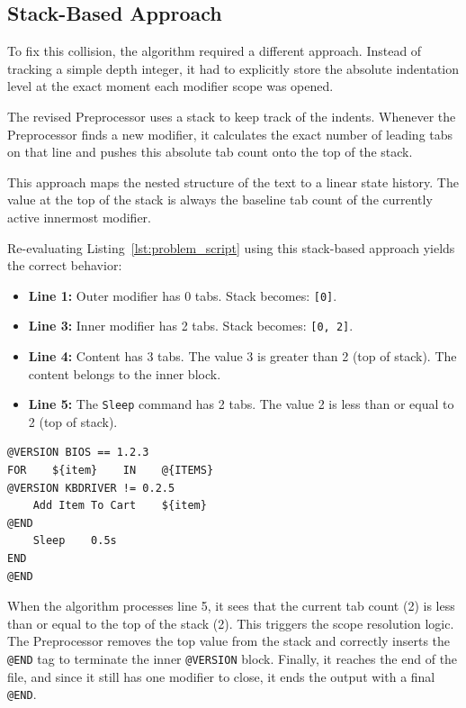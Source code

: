 \subsection{Stack-Based Approach}


To fix this collision, the algorithm required a different approach. Instead of tracking a simple depth integer, it had to explicitly store the absolute indentation level at the exact moment each modifier scope was opened. 

The revised Preprocessor uses a stack to keep track of the indents. Whenever the Preprocessor finds a new modifier, it calculates the exact number of leading tabs on that line and pushes this absolute tab count onto the top of the stack.


This approach maps the nested structure of the text to a linear state history. The value at the top of the stack is always the baseline tab count of the currently active innermost modifier.


Re-evaluating Listing~\ref{lst:problem_script} using this stack-based approach yields the correct behavior:

\begin{itemize}

    \item \textbf{Line 1:} Outer modifier has 0 tabs. Stack becomes: \texttt{[0]}.

    \item \textbf{Line 3:} Inner modifier has 2 tabs. Stack becomes: \texttt{[0, 2]}.

    \item \textbf{Line 4:} Content has 3 tabs. The value 3 is greater than 2 (top of stack). The content belongs to the inner block.

    \item \textbf{Line 5:} The \texttt{Sleep} command has 2 tabs. The value 2 is less than or equal to 2 (top of stack). 

\end{itemize}

\begin{lstlisting}[caption={Correct output of the problematic script with the final approach}, label={lst:problem_script_correct}, float=htbp]
@VERSION BIOS == 1.2.3
FOR    ${item}    IN    @{ITEMS}
@VERSION KBDRIVER != 0.2.5
    Add Item To Cart    ${item}
@END
    Sleep    0.5s
END
@END
\end{lstlisting}

When the algorithm processes line 5, it sees that the current tab count (2) is less than or equal to the top of the stack (2). This triggers the scope resolution logic. The Preprocessor removes the top value from the stack and correctly inserts the \texttt{@END} tag to terminate the inner \texttt{@VERSION} block. Finally, it reaches the end of the file, and since it still has one modifier to close, it ends the output with a final \texttt{@END}.

